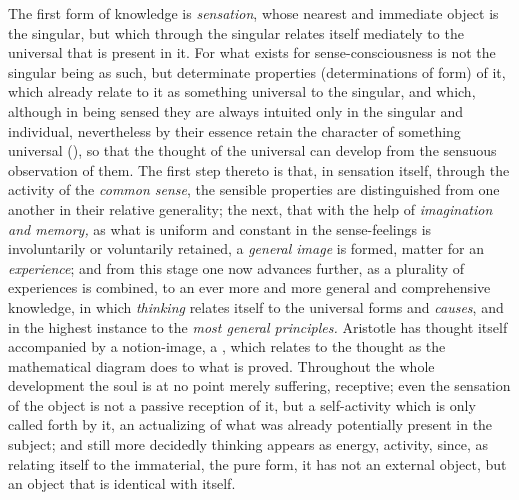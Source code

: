 The first form of knowledge is \emph{sensation}, whose nearest and immediate object is the singular, but which through the singular relates itself mediately to the universal that is present in it. For what exists for sense-consciousness is not the singular being as such, but determinate properties (determinations of form) of it, which already relate to it as something universal to the singular, and which, although in being sensed they are always intuited only in the singular and individual, nevertheless by their essence retain the character of something universal (), so that the thought of the universal can develop from the sensuous observation of them. The first step
thereto is that, in sensation itself, through the activity of the \emph{common sense}, the sensible properties are distinguished from one another in their relative generality; the next, that with the help of \emph{imagination and memory,} as what is uniform and constant in the sense-feelings is involuntarily or voluntarily retained, a \emph{general image} is formed, matter for an \emph{experience}; and from this stage one now advances further, as a plurality of experiences is combined, to an ever more and more general and comprehensive knowledge, in which \emph{thinking} relates itself to the universal forms and \emph{causes}, and in the highest instance to the \emph{most general principles.} Aristotle has thought itself accompanied by a notion-image, a , which relates to the thought as the mathematical diagram does to what is proved. Throughout the whole development the soul is at no point merely suffering, receptive; even the sensation of the object is not a passive reception of it, but a self-activity which is only called forth by it, an actualizing of what was already potentially present in the subject; and still more decidedly thinking appears as energy, activity, since, as relating itself to the immaterial, the pure form, it has not an external object, but an object that is identical with itself.

